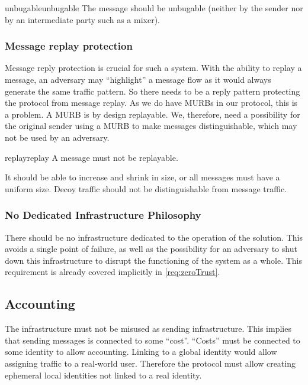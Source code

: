 \begin{requirement}{unbugable}{unbugable}
	The message should be unbugable (neither by the sender nor by an intermediate party such as a mixer).
\end{requirement}

\subsubsection{Message replay protection}
Message reply protection is crucial for such a system. With the ability to replay a message, an adversary may ``highlight'' a message flow as it would always generate the same traffic pattern. So there needs to be a reply pattern protecting the protocol from message replay. As we do have MURBs in our protocol, this is a problem. A MURB is by design replayable. We, therefore, need a possibility for the original sender using a MURB to make messages distinguishable, which may not be used by an adversary.

\begin{requirement}{replay}{replay}
	A message must not be replayable.
\end{requirement}

It should be able to increase and shrink in size, or all messages must have a uniform size. Decoy traffic should not be distinguishable from message traffic. 

\subsubsection{No Dedicated Infrastructure Philosophy}
There should be no infrastructure dedicated to the operation of the solution. This avoids a single point of failure, as well as the possibility for an adversary to shut down this infrastructure to disrupt the functioning of the system as a whole. This requirement is already covered implicitly in \ref{req:zeroTrust}.

\subsection{Accounting}
The infrastructure must not be misused as  sending infrastructure. This implies that sending messages is connected to some ``cost''. ``Costs'' must be connected to some identity to allow accounting. Linking to a global identity would allow assigning traffic to a real-world user. Therefore the protocol must allow creating ephemeral local identities not linked to a real identity.

